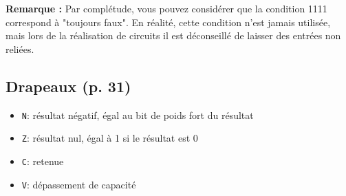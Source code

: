 \documentclass{article}
\begin{document}
    \textbf{Remarque :} Par complétude, vous pouvez considérer que la condition 1111 correspond à "toujours faux". En réalité, cette condition n'est jamais utilisée, mais lors de la réalisation de circuits il est déconseillé de laisser des entrées non reliées.

    \subsection{Drapeaux (p. 31)}
    \label{subsec:Flags}

    \begin{itemize}
        \item \texttt{N}: résultat négatif, égal au bit de poids fort du résultat
        \item \texttt{Z}: résultat nul, égal à 1 si le résultat est 0
        \item \texttt{C}: retenue
        \item \texttt{V}: dépassement de capacité
    \end{itemize}
\end{document}
